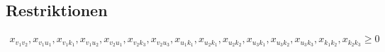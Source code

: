 \documentclass[a4paper,11pt]{article}
\begin{document}
\subsection*{Restriktionen}
\begin{align*}
    x_{v_1 v_2},
    x_{v_1 u_1},
    x_{v_1 k_1},
    x_{v_1 u_2},
    x_{v_2 u_1},
    x_{v_2 k_3},
    x_{v_2 u_3},
    x_{u_1 k_1},
    x_{u_2 k_1},
    x_{u_2 k_2},
    x_{u_3 k_1},
    x_{u_3 k_2},
    x_{u_3 k_3},
    x_{k_1 k_2},
    x_{k_2 k_3} \ge 0 \\
\end{align*}
\end{document}
